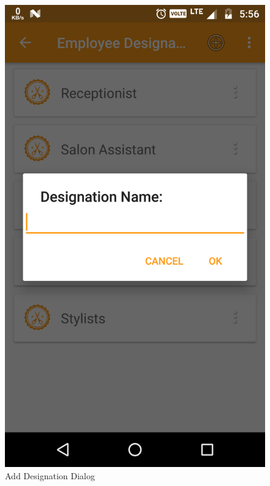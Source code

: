 \\
\begin{figure}[h]
	\centering
	\includegraphics[width=0.7\linewidth]{AddDesignationDialog}
	\caption{Add Designation Dialog}
\end{figure}
\pagebreak

